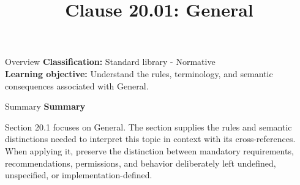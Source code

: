 \documentclass[10pt,letterpaper]{article}
\title{Clause 20.01: General}
\author{}
\date{}
\begin{document}
\maketitle
\begin{CornellOverviewBox}{Overview}
\textbf{Classification:} Standard library - Normative\\[2pt]
\textbf{Learning objective:} Understand the rules, terminology, and semantic consequences associated with General.
\end{CornellOverviewBox}\begin{CornellSummaryBox}{Summary}
{\sffamily\bfseries\color{Accent} Summary}\par\vspace{3pt}Section 20.1 focuses on General. The section supplies the rules and semantic distinctions needed to interpret this topic in context with its cross-references. When applying it, preserve the distinction between mandatory requirements, recommendations, permissions, and behavior deliberately left undefined, unspecified, or implementation-defined.
\end{CornellSummaryBox}
\end{document}
